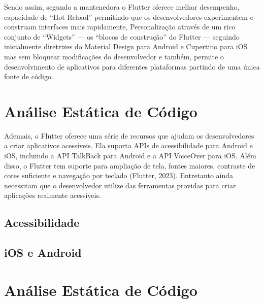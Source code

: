 Sendo assim, segundo a mantenedora o Flutter oferece melhor desempenho, capacidade de “Hot Reload” permitindo que os desenvolvedores experimentem e construam interfaces mais rapidamente, Personalização através de um rico conjunto de “Widgets” --- os “blocos de construção” do Flutter --- seguindo inicialmente diretrizes do Material Design para Android e Cupertino para iOS mas sem bloquear modificações do desenvolvedor e também, permite o desenvolvimento de aplicativos para diferentes plataformas partindo de uma única fonte de código.

\section{Análise Estática de Código}

Ademais, o Flutter oferece uma série de recursos que ajudam os desenvolvedores a criar aplicativos acessíveis. Ela suporta APIs de acessibilidade para Android e iOS, incluindo a API TalkBack para Android e a API VoiceOver para iOS. Além disso, o Flutter tem suporte para ampliação de tela, fontes maiores, contraste de cores suficiente e navegação por teclado (Flutter, 2023). Entretanto ainda necessitam que o desenvolvedor utilize das ferramentas providas para criar aplicações realmente acessíveis.

\subsection{Acessibilidade}

\subsection{iOS e Android}

\section{Análise Estática de Código}
